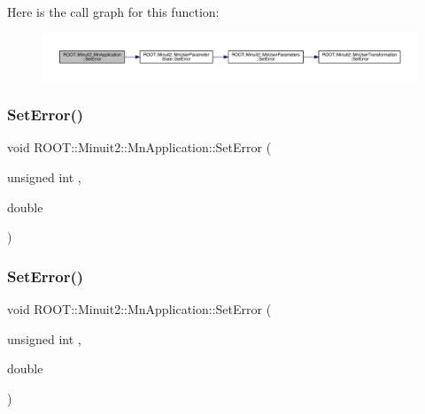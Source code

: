 Here is the call graph for this function\+:
\nopagebreak
\begin{figure}[H]
\begin{center}
\leavevmode
\includegraphics[width=350pt]{df/dd5/classROOT_1_1Minuit2_1_1MnApplication_a04e02c59439b7c638cea29938030b2f8_cgraph}
\end{center}
\end{figure}
\mbox{\label{classROOT_1_1Minuit2_1_1MnApplication_a04e02c59439b7c638cea29938030b2f8}} 
\subsubsection{\texorpdfstring{SetError()}{SetError()}\hspace{0.1cm}{\footnotesize\ttfamily [2/6]}}
{\footnotesize\ttfamily void R\+O\+O\+T\+::\+Minuit2\+::\+Mn\+Application\+::\+Set\+Error (\begin{DoxyParamCaption}\item[{unsigned int}]{,  }\item[{double}]{ }\end{DoxyParamCaption})}

\mbox{\label{classROOT_1_1Minuit2_1_1MnApplication_a04e02c59439b7c638cea29938030b2f8}} 
\subsubsection{\texorpdfstring{SetError()}{SetError()}\hspace{0.1cm}{\footnotesize\ttfamily [3/6]}}
{\footnotesize\ttfamily void R\+O\+O\+T\+::\+Minuit2\+::\+Mn\+Application\+::\+Set\+Error (\begin{DoxyParamCaption}\item[{unsigned int}]{,  }\item[{double}]{ }\end{DoxyParamCaption})}

